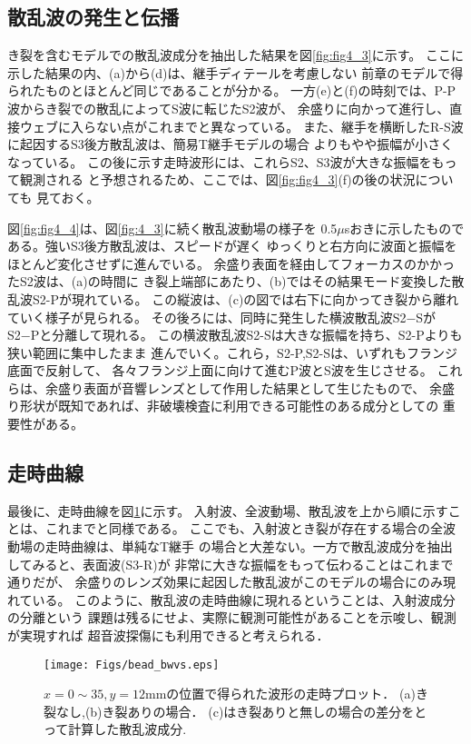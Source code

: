\subsection{散乱波の発生と伝播}
き裂を含むモデルでの散乱波成分を抽出した結果を図\ref{fig:fig4_3}に示す。
ここに示した結果の内、(a)から(d)は、継手ディテールを考慮しない
前章のモデルで得られたものとほとんど同じであることが分かる。
一方(e)と(f)の時刻では、P-P波からき裂での散乱によってS波に転じたS2波が、
余盛りに向かって進行し、直接ウェブに入らない点がこれまでと異なっている。
また、継手を横断したR-S波に起因するS3後方散乱波は、簡易T継手モデルの場合
よりもやや振幅が小さくなっている。
この後に示す走時波形には、これらS2、S3波が大きな振幅をもって観測される
と予想されるため、ここでは、図\ref{fig:fig4_3}(f)の後の状況についても
見ておく。

図\ref{fig:fig4_4}は、図\ref{fig:4_3}に続く散乱波動場の様子を
0.5$\mu$sおきに示したものである。強いS3後方散乱波は、スピードが遅く
ゆっくりと右方向に波面と振幅をほとんど変化させずに進んでいる。
余盛り表面を経由してフォーカスのかかったS2波は、(a)の時間に
き裂上端部にあたり、(b)ではその結果モード変換した散乱波S2-Pが現れている。
この縦波は、(c)の図では右下に向かってき裂から離れていく様子が見られる。
その後ろには、同時に発生した横波散乱波S2−SがS2−Pと分離して現れる。
この横波散乱波S2-Sは大きな振幅を持ち、S2-Pよりも狭い範囲に集中したまま
進んでいく。これら，S2-P,S2-Sは、いずれもフランジ底面で反射して、
各々フランジ上面に向けて進むP波とS波を生じさせる。
これらは、余盛り表面が音響レンズとして作用した結果として生じたもので、
余盛り形状が既知であれば、非破壊検査に利用できる可能性のある成分としての
重要性がある。

\subsection{走時曲線}
最後に、走時曲線を図\ref{fig:fig4_5}に示す。
入射波、全波動場、散乱波を上から順に示すことは、これまでと同様である。
ここでも、入射波とき裂が存在する場合の全波動場の走時曲線は、単純なT継手
の場合と大差ない。一方で散乱波成分を抽出してみると、表面波(S3-R)が
非常に大きな振幅をもって伝わることはこれまで通りだが、
余盛りのレンズ効果に起因した散乱波がこのモデルの場合にのみ現れている。
このように、散乱波の走時曲線に現れるということは、入射波成分の分離という
課題は残るにせよ、実際に観測可能性があることを示唆し、観測が実現すれば
超音波探傷にも利用できると考えられる．
\begin{figure}[h]
	\begin{center}
	\texttt{[image: Figs/bead\_bwvs.eps]} 
	\end{center}
	\caption{
		$x=0\sim35, y=12$mmの位置で得られた波形の走時プロット．
		(a)き裂なし,(b)き裂ありの場合．
		(c)はき裂ありと無しの場合の差分をとって計算した散乱波成分.
	} 
	\label{fig:fig4_5}
\end{figure}


